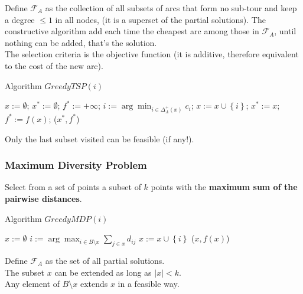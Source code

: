 Define $\mathcal{F}_A$ as the collection of all subsets of arcs that form no sub-tour and keep a degree $\leq 1$ in all nodes, (it is a superset of the partial solutions). The constructive algorithm add each time the cheapest arc among those in $\mathcal{F}_A$, until nothing can be added, that's the solution.\\

The selection criteria is the objective function (it is additive, therefore equivalent to the cost of the new arc).

\begin{algorithm}
	\caption{Algorithm $GreedyTSP(i)$}
	\begin{algorithmic}
		\STATE $x := \emptyset$; $x^\ast := \emptyset$;
		\STATE $f^\ast := + \infty$;
		\STATE $i := \arg \min_{i \in \Delta_A^+ (x)} c_i$;
		\STATE $x := x \cup \left\{i\right\}$;
		\ENDWHILE
		\STATE $x^\ast := x$; $f^\ast := f(x)$;
		\ENDIF
		\RETURN ($x^\ast, f^\ast$)
	\end{algorithmic}
\end{algorithm}
Only the last subset visited can be feasible (if any!).\\

\newpage

\subsubsection{Maximum Diversity Problem}
Select from a set of points a subset of $k$ points with the \textbf{maximum sum of the pairwise distances}.\\

\begin{algorithm}
	\caption{Algorithm $GreedyMDP(i)$}
	\begin{algorithmic}
		\STATE $x := \emptyset$
		\WHILE{$|x| < k$}
		\STATE $i := \arg \max_{i \in B \setminus x} \sum_{j \in x} d_{ij}$
		\STATE $x := x \cup \left\{i\right\}$
		\ENDWHILE
		\RETURN ($x, f(x)$)
	\end{algorithmic}
\end{algorithm}

Define $\mathcal{F}_A$ as the set of all partial solutions.\\

The subset $x$ can be extended as long as $|x| < k$.\\

Any element of $B \setminus x$ extends $x$ in a feasible way.\\

